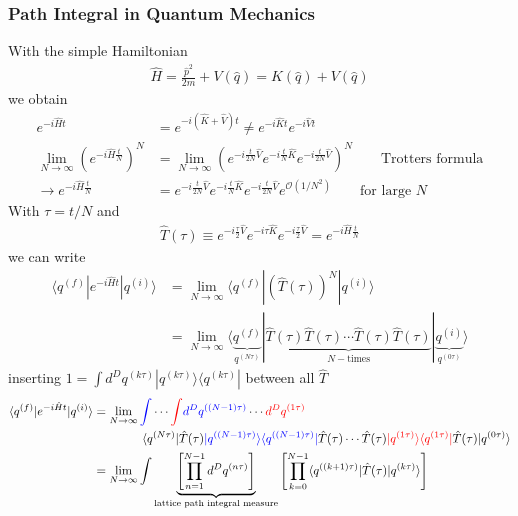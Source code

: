 \documentclass[10pt,a4paper]{article}
\theoremstyle{definition}
\begin{document}
\subsubsection{Path Integral in Quantum Mechanics}
With the simple Hamiltonian
\begin{align}
\hat{H}=\frac{\hat{p}^2}{2m}+V(\hat{q})=K(\hat{q})+V(\hat{q})
\end{align}
we obtain
\begin{align}
e^{-i\hat{H}t}&=e^{-i(\hat{K}+\hat{V})t}\neq e^{-i\hat{K}t}e^{-i\hat{V}t}\\
\lim_{N\rightarrow\infty}\left(e^{-i\hat{H}\frac{t}{N}}\right)^N&=\lim_{N\rightarrow\infty}\left(e^{-i\frac{t}{2N}\hat{V}}e^{-i\frac{t}{N}\hat{K}}e^{-i\frac{t}{2N}\hat{V}}\right)^N\qquad\text{Trotters formula}\\
\rightarrow e^{-i\hat{H}\frac{t}{N}}&=e^{-i\frac{t}{2N}\hat{V}}e^{-i\frac{t}{N}\hat{K}}e^{-i\frac{t}{2N}\hat{V}}e^{\mathcal{O}(1/N^2)}\qquad\text{for large $N$}
\end{align}
With $\tau=t/N$ and
\begin{align}
\hat{T}(\tau)\equiv e^{-i\frac{\tau}{2}\hat{V}}e^{-i\tau\hat{K}}e^{-i\frac{\tau}{2}\hat{V}}=e^{-i\hat{H}\frac{t}{N}}
\end{align}
we can write 
\begin{align}
\langle q^{(f)}|e^{-i\hat{H}t}|q^{(i)}\rangle 
&= \lim_{N\rightarrow\infty} \langle q^{(f)}|\left(\hat{T}(\tau)\right)^N|q^{(i)}\rangle\\
&= \lim_{N\rightarrow\infty} \langle \underbrace{q^{(f)}}_{q^{(N\tau)}}|\underbrace{\hat{T}(\tau)\hat{T}(\tau)\cdots\hat{T}(\tau)\hat{T}(\tau)}_{N-\text{times}}|\underbrace{q^{(i)}}_{q^{(0\tau)}}\rangle
\end{align}
inserting $1=\int d^D q^{(k\tau)}|q^{(k\tau)}\rangle\langle q^{(k\tau)}|$ between all $\hat{T}$
\begin{align}
\langle q^{(f)}|e^{-i\hat{H}t}|q^{(i)}\rangle 
&= \lim_{N\rightarrow\infty}\textcolor{blue}{\int}\cdots\textcolor{red}{\int} \textcolor{blue}{d^Dq^{((N-1)\tau)}}\cdots \textcolor{red}{d^Dq^{(1\tau)}}\\
&\qquad\qquad \langle q^{(N\tau)}|\hat{T}(\tau)\textcolor{blue}{|q^{((N-1)\tau)}\rangle\langle q^{((N-1)\tau)}|}\hat{T}(\tau)\cdots\hat{T}(\tau)\textcolor{red}{|q^{(1\tau)}\rangle\langle q^{(1\tau)}|}\hat{T}(\tau)|q^{(0\tau)}\rangle\\
&=\lim_{N\rightarrow\infty}\int\underbrace{\left[\prod_{n=1}^{N-1}d^Dq^{(n\tau)}\right]}_{\text{lattice path integral measure}}\left[\prod_{k=0}^{N-1}\langle q^{((k+1)\tau)}|\hat{T}(\tau)|q^{(k\tau)}\rangle\right]
\end{align}
\end{document}
